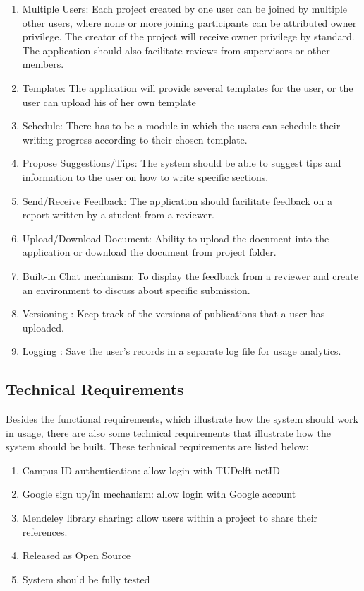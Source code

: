 \begin{enumerate}
	\item Multiple Users: Each project created by one user can be joined by multiple other users, where none or more joining participants can be attributed owner privilege. The creator of the project will receive owner privilege by standard. The application should also facilitate reviews from supervisors or other members.
	\item Template: The application will provide several templates for the user, or the user can upload his of her own template
	\item Schedule: There has to be a module in which the users can schedule their writing progress according to their chosen template.
	\item Propose Suggestions/Tips: The system should be able to suggest tips and information to the user on how to write specific sections.
	\item Send/Receive Feedback: The application should facilitate feedback on a report written by a student from a reviewer.
	
	\item Upload/Download Document: Ability to upload the document into the application or download the document from project folder.
	\item Built-in Chat mechanism: To display the feedback from a reviewer and create an environment to discuss about specific submission. 
	\item Versioning : Keep track of the versions of publications that a user has uploaded.
	\item Logging : Save the user's records in a separate log file for usage analytics.
\end{enumerate}

\subsection{Technical Requirements} %
\label{sub:technical_requirements}

Besides the functional requirements, which illustrate how the system should work in usage, there are also some technical requirements that illustrate how the system should be built. These technical requirements are listed below:

\begin{enumerate}
	\item Campus ID authentication: allow login with TUDelft netID
	\item Google sign up/in mechanism: allow login with Google account
	\item Mendeley library sharing: allow users within a project to share their references.
	\item Released as Open Source
 	\item System should be fully tested 
\end{enumerate}

